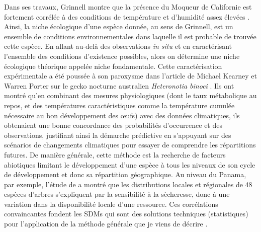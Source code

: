 Dans ses travaux, Grinnell montre que la présence du Moqueur de
Californie est fortement corrélée à des conditions de température et
d'humidité assez élevées \citep{Grinnell1917a}. Ainsi, la niche
écologique d'une espèce donnée, au sens de Grinnell, est un ensemble de
conditions environnementales dans laquelle il est probable de trouvée
cette espèce. En allant au-delà des observations \emph{in situ} et en
caractérisant l'ensemble des conditions d'existence possibles, alors on
détermine une niche écologique théorique appelée niche fondamentale.
Cette caractérisation expérimentale a été poussée à son paroxysme dans
l'article de Michael Kearney et Warren Porter sur le gecko nocturne
australien \emph{Heteronotia binoei} \citep{Kearney2004}. Ils ont montré
qu'en combinant des mesures physiologiques (dont le taux métabolique au
repos, et des températures caractéristiques comme la température cumulée
nécessaire au bon développement des œufs) avec des données climatiques,
ils obtenaient une bonne concordance des probabilités d'occurrence et
des observations, justifiant ainsi la démarche prédictive en s'appuyant
sur des scénarios de changements climatiques pour essayer de comprendre
les répartitions futures. De manière générale, cette méthode est la
recherche de facteurs abiotiques limitant le développement d'une espèce
à tous les niveaux de son cycle de développement et donc sa répartition
géographique. Au niveau du Panama, par exemple, l'étude de
\citet{Engelbrecht2007} a montré que les distributions locales et
régionales de 48 espèces d'arbres s'expliquent par la sensibilité à la
sècheresse, donc à une variation dans la disponibilité locale d'une
ressource. Ces corrélations convaincantes fondent les SDMs qui sont des
solutions techniques (statistiques) pour l'application de la méthode
générale que je viens de décrire \citep{Elith2006, Elith2009a}.

